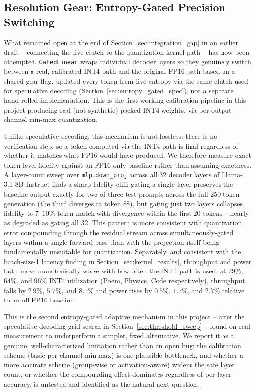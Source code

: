 \documentclass[10pt,journal,compsoc,twocolumn]{IEEEtran}
\begin{document}
\subsection{Resolution Gear: Entropy-Gated Precision Switching}
\label{sec:resolution_gear}
What remained open at the end of Section~\ref{sec:integration_gap} in an earlier draft -- connecting the live clutch to the quantization kernel path -- has now been attempted. \texttt{GatedLinear} wraps individual decoder layers so they genuinely switch between a real, calibrated INT4 path and the original FP16 path based on a shared gear flag, updated every token from live entropy via the same clutch used for speculative decoding (Section~\ref{sec:entropy_gated_spec}), not a separate hand-rolled implementation. This is the first working calibration pipeline in this project producing real (not synthetic) packed INT4 weights, via per-output-channel min-max quantization.

Unlike speculative decoding, this mechanism is not lossless: there is no verification step, so a token computed via the INT4 path is final regardless of whether it matches what FP16 would have produced. We therefore measure exact token-level fidelity against an FP16-only baseline rather than assuming exactness. A layer-count sweep over \texttt{mlp.down\_proj} across all 32 decoder layers of Llama-3.1-8B-Instruct finds a sharp fidelity cliff: gating a single layer preserves the baseline output exactly for two of three test prompts across the full 250-token generation (the third diverges at token 88), but gating just two layers collapses fidelity to $7$--$10\%$ token match with divergence within the first $20$ tokens -- nearly as degraded as gating all 32. This pattern is more consistent with quantization error compounding through the residual stream across simultaneously-gated layers within a single forward pass than with the projection itself being fundamentally unsuitable for quantization. Separately, and consistent with the batch-size-1 latency finding in Section~\ref{sec:kernel_results}, throughput and power both move monotonically worse with how often the INT4 path is used: at $29\%$, $64\%$, and $96\%$ INT4 utilization (Poem, Physics, Code respectively), throughput falls by $2.9\%$, $5.7\%$, and $8.1\%$ and power rises by $0.5\%$, $1.7\%$, and $2.7\%$ relative to an all-FP16 baseline.

This is the second entropy-gated adaptive mechanism in this project -- after the speculative-decoding grid search in Section~\ref{sec:threshold_sweep} -- found on real measurement to underperform a simpler, fixed alternative. We report it as a genuine, well-characterized limitation rather than an open bug: the calibration scheme (basic per-channel min-max) is one plausible bottleneck, and whether a more accurate scheme (group-wise or activation-aware) widens the safe layer count, or whether the compounding effect dominates regardless of per-layer accuracy, is untested and identified as the natural next question.
\end{document}
